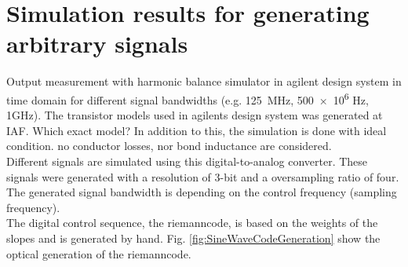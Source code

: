 \chapter{Simulation results for generating arbitrary signals}
Output measurement with harmonic balance simulator in agilent design system in time domain for different signal bandwidths (e.g. \SI{125}{\MHz}, \num{500e6} Hz, 1GHz). The transistor models used in agilents design system was generated at IAF. Which exact model? In addition to this, the simulation is done with ideal condition. no conductor losses, nor bond inductance are considered.\\
Different signals are simulated using this digital-to-analog converter. These signals were generated with a resolution of 3-bit and a oversampling ratio of four. The generated signal bandwidth is depending on the control frequency (sampling frequency).
\\ The digital control sequence, the riemanncode, is based on the weights of the slopes and is generated by hand. Fig. \ref{fig:SineWaveCodeGeneration} show the optical generation of the riemanncode.

